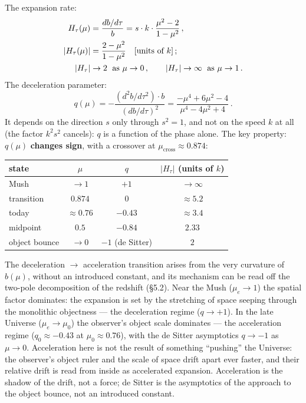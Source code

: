 \documentclass{article}
\begin{document}
The expansion rate:
\begin{align}
H_\tau(\mu) &= \frac{db/d\tau}{b} = s\cdot k\cdot\frac{\mu^2 - 2}{1 - \mu^2}\,, \\
|H_\tau(\mu)| &= \frac{2 - \mu^2}{1 - \mu^2} \quad [\text{units of } k]\,; \\
|H_\tau| &\to 2 \;\text{ as } \mu \to 0\,, \qquad |H_\tau| \to \infty \;\text{ as } \mu \to 1\,. \notag
\end{align}
The deceleration parameter:
\begin{equation}
q(\mu) = -\frac{(d^2 b/d\tau^2)\cdot b}{(db/d\tau)^2} = \frac{-\mu^4 + 6\mu^2 - 4}{\mu^4 - 4\mu^2 + 4}\,.
\end{equation}
It depends on the direction $s$ only through $s^2 = 1$, and not on the speed $k$ at all (the factor $k^2 s^2$ cancels): $q$ is a function of the phase alone. The key property: $q(\mu)$ \textbf{changes sign}, with a crossover at $\mu_{\text{cross}} \approx 0.874$:

\begin{table}[htbp]
\centering
\small
\begin{tabular}{@{}lccc@{}}
\toprule
\textbf{state} & $\mu$ & $q$ & $|H_\tau|$ (units of $k$) \\
\midrule
Mush & $\to 1$ & $+1$ & $\to \infty$ \\
transition & $0.874$ & $0$ & $\approx 5.2$ \\
today & $\approx 0.76$ & $-0.43$ & $\approx 3.4$ \\
midpoint & $0.5$ & $-0.84$ & $2.33$ \\
object bounce & $\to 0$ & $-1$ (de Sitter) & $2$ \\
\bottomrule
\end{tabular}
\end{table}

The deceleration $\to$ acceleration transition arises from the very curvature of $b(\mu)$, without an introduced constant, and its mechanism can be read off the two-pole decomposition of the redshift (\S5.2). Near the Mush ($\mu_e \to 1$) the spatial factor dominates: the expansion is set by the stretching of space seeping through the monolithic objectness --- the deceleration regime ($q \to +1$). In the late Universe ($\mu_e \to \mu_0$) the observer's object scale dominates --- the acceleration regime ($q_0 \approx -0.43$ at $\mu_0 \approx 0.76$), with the de Sitter asymptotics $q \to -1$ as $\mu \to 0$. Acceleration here is not the result of something ``pushing'' the Universe: the observer's object ruler and the scale of space drift apart ever faster, and their relative drift is read from inside as accelerated expansion. Acceleration is the shadow of the drift, not a force; de Sitter is the asymptotics of the approach to the object bounce, not an introduced constant.
\end{document}
